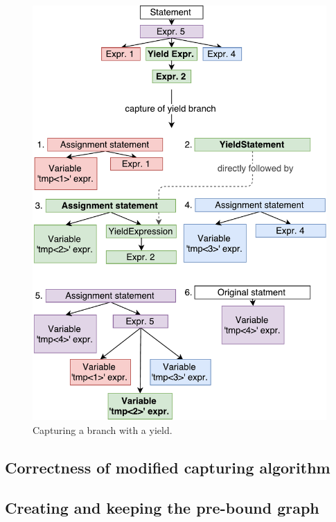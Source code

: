 \begin{figure}[h]
	\centering	
	\includegraphics[scale=0.75]{../img/5_3_branchesWithYields}	
	\caption{Capturing a branch with a yield.}
	\label{fig5.3:CaptureWithYield}
\end{figure}

\subsection{Correctness of modified capturing algorithm}

\subsection{Creating and keeping the pre-bound graph}

